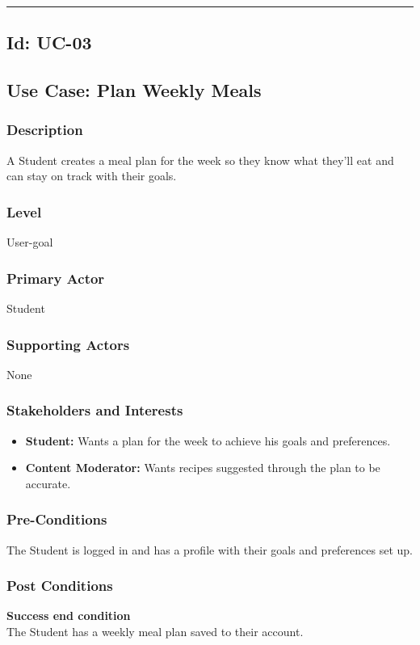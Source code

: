 \documentclass[10pt,letterpaper]{article}
\newcommand{\ucseparator}{\vspace{1em}\noindent\rule{\linewidth}{0.4pt}\vspace{1.5em}}
\begin{document}
\ucseparator

\subsection*{Id: UC-03}
\subsection*{Use Case: Plan Weekly Meals}
\subsubsection*{Description}
A Student creates a meal plan for the week so they know what they'll eat and can stay on track with their goals.
\subsubsection*{Level}
User-goal
\subsubsection*{Primary Actor}
Student
\subsubsection*{Supporting Actors}
None
\subsubsection*{Stakeholders and Interests}
\begin{itemize}
    \item \textbf{Student:} Wants a plan for the week to achieve his goals and preferences.
    \item \textbf{Content Moderator:} Wants recipes suggested through the plan to be accurate.
\end{itemize}

\subsubsection*{Pre-Conditions}
The Student is logged in and has a profile with their goals and preferences set up.

\subsubsection*{Post Conditions}
\textbf{Success end condition}\\
The Student has a weekly meal plan saved to their account.
\end{document}
